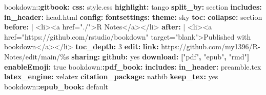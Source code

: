 \documentclass[
  a4paper,
  twoside,
  openright]{book}
\newenvironment{Shaded}{\begin{snugshade}}{\end{snugshade}}
\newcommand{\AttributeTok}[1]{\textcolor[rgb]{0.13,0.29,0.53}{#1}}
\newcommand{\CharTok}[1]{\textcolor[rgb]{0.31,0.60,0.02}{#1}}
\newcommand{\DecValTok}[1]{\textcolor[rgb]{0.00,0.00,0.81}{#1}}
\newcommand{\FunctionTok}[1]{\textcolor[rgb]{0.13,0.29,0.53}{\textbf{#1}}}
\newcommand{\KeywordTok}[1]{\textcolor[rgb]{0.13,0.29,0.53}{\textbf{#1}}}
\newcommand{\NormalTok}[1]{#1}
\newcommand{\StringTok}[1]{\textcolor[rgb]{0.31,0.60,0.02}{#1}}
\theoremstyle{definition}
\theoremstyle{definition}
\theoremstyle{definition}
\theoremstyle{definition}
\theoremstyle{remark}
\begin{document}
\begin{Shaded}
\begin{Highlighting}[]
\AttributeTok{bookdown:}\FunctionTok{:gitbook}\KeywordTok{:}
\AttributeTok{  }\FunctionTok{css}\KeywordTok{:}\AttributeTok{ style.css}
\AttributeTok{  }\FunctionTok{highlight}\KeywordTok{:}\AttributeTok{ tango}
\AttributeTok{  }\FunctionTok{split\_by}\KeywordTok{:}\AttributeTok{ section}
\AttributeTok{  }\FunctionTok{includes}\KeywordTok{:}
\AttributeTok{    }\FunctionTok{in\_header}\KeywordTok{:}\AttributeTok{ head.html}
\AttributeTok{  }\FunctionTok{config}\KeywordTok{:}
\AttributeTok{    }\FunctionTok{fontsettings}\KeywordTok{:}
\AttributeTok{      }\FunctionTok{theme}\KeywordTok{:}\AttributeTok{ sky}
\AttributeTok{    }\FunctionTok{toc}\KeywordTok{:}
\AttributeTok{      }\FunctionTok{collapse}\KeywordTok{:}\AttributeTok{ section}
\FunctionTok{      before}\KeywordTok{: }\CharTok{|}
\NormalTok{        \textless{}li\textgreater{}\textless{}a href="./"\textgreater{}R Notes\textless{}/a\textgreater{}\textless{}/li\textgreater{}}
\FunctionTok{      after}\KeywordTok{: }\CharTok{|}
\NormalTok{        \textless{}li\textgreater{}\textless{}a href="https://github.com/rstudio/bookdown" target="blank"\textgreater{}Published with bookdown\textless{}/a\textgreater{}\textless{}/li\textgreater{}}
\AttributeTok{    }\FunctionTok{toc\_depth}\KeywordTok{:}\AttributeTok{ }\DecValTok{3}
\AttributeTok{    }\FunctionTok{edit}\KeywordTok{:}\AttributeTok{ }
\AttributeTok{        }\FunctionTok{link}\KeywordTok{:}\AttributeTok{ https://github.com/my1396/R{-}Notes/edit/main/\%s}
\AttributeTok{    }\FunctionTok{sharing}\KeywordTok{:}
\AttributeTok{        }\FunctionTok{github}\KeywordTok{:}\AttributeTok{ }\CharTok{yes}
\AttributeTok{    }\FunctionTok{download}\KeywordTok{:}\AttributeTok{ }\KeywordTok{[}\StringTok{"pdf"}\KeywordTok{,}\AttributeTok{ }\StringTok{"epub"}\KeywordTok{,}\AttributeTok{ }\StringTok{"rmd"}\KeywordTok{]}
\AttributeTok{    }\FunctionTok{enableEmoji}\KeywordTok{:}\AttributeTok{ }\CharTok{true}
\AttributeTok{bookdown:}\FunctionTok{:pdf\_book}\KeywordTok{:}
\AttributeTok{  }\FunctionTok{includes}\KeywordTok{:}
\AttributeTok{    }\FunctionTok{in\_header}\KeywordTok{:}\AttributeTok{ preamble.tex}
\AttributeTok{  }\FunctionTok{latex\_engine}\KeywordTok{:}\AttributeTok{ xelatex}
\AttributeTok{  }\FunctionTok{citation\_package}\KeywordTok{:}\AttributeTok{ natbib}
\AttributeTok{  }\FunctionTok{keep\_tex}\KeywordTok{:}\AttributeTok{ }\CharTok{yes}
\AttributeTok{bookdown:}\FunctionTok{:epub\_book}\KeywordTok{:}\AttributeTok{ default}
\end{Highlighting}
\end{Shaded}
\end{document}
